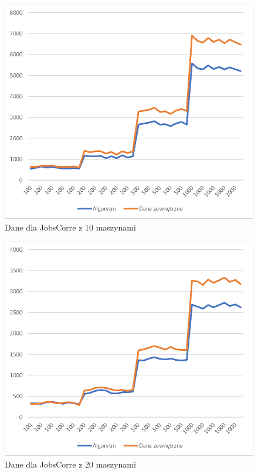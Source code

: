 \begin{figure}[h]
    \centering
    \includegraphics[scale=0.3]{jobs_10.png}
    \caption{Dane dla JobsCorre z 10 maszynami}
    \label{jobs_10}
\end{figure}

\begin{figure}[h]
    \centering
    \includegraphics[scale=0.3]{jobs_20.png}
    \caption{Dane dla JobsCorre z 20 maszynami}
    \label{jobs_20}
\end{figure}

